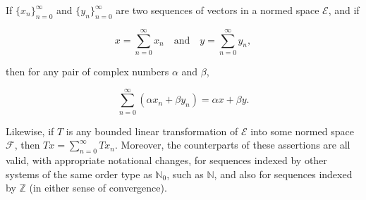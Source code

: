 If $\{x_n\}_{n=0}^{\infty}$ and $\{y_n\}_{n=0}^{\infty}$ are two sequences of vectors in a normed space $\mathcal{E}$, and if

$$x = \sum_{n=0}^{\infty} x_n \quad \text{and} \quad y = \sum_{n=0}^{\infty} y_n,$$

then for any pair of complex numbers $\alpha$ and $\beta$,

$$\sum_{n=0}^{\infty} (\alpha x_n + \beta y_n) = \alpha x + \beta y.$$

Likewise, if $T$ is any bounded linear transformation of $\mathcal{E}$ into some normed space $\mathcal{F}$, then $Tx = \sum_{n=0}^{\infty} Tx_n$. Moreover, the counterparts of these assertions are all valid, with appropriate notational changes, for sequences indexed by other systems of the same order type as $\mathbb{N}_0$, such as $\mathbb{N}$, and also for sequences indexed by $\mathbb{Z}$ (in either sense of convergence).
